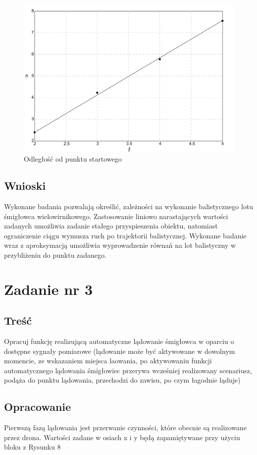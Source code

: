 \documentclass[polish,11pt,a4paper]{article}
\begin{document}
\begin{figure}[h]
    \centering
    \includegraphics[width=0.65\linewidth]{paraboliczna/st.png}
    \caption{Odległość od punktu startowego}
    \label{fig:enter-label}
\end{figure}

\break
\subsection*{Wnioski}
Wykonane badania pozwalają określić, zależności na wykonanie balistycznego lotu śmigłowca wielowirnikowego.
Zastosowanie liniowo narastających wartości zadanych umożliwia zadanie stałego przyspieszenia obiektu, natomiast
ograniczenie ciągu wymusza ruch po trajektorii balistycznej. Wykonane badanie wraz z aproksymacją umożliwia 
wyprowadzenie równań na lot balistyczny w przybliżeniu do punktu zadanego.

\section*{Zadanie nr 3}
\subsection*{Treść}
Opracuj funkcję realizującą automatyczne lądowanie śmigłowca w oparciu o dostępne 
sygnały pomiarowe (lądowanie może być aktywowane w dowolnym momencie, ze wskazaniem miejsca laowania,
po aktywowaniu funkcji automatycznego lądowania śmigłowiec przerywa wcześniej realizowany scenariusz,
podąża do punktu lądowania, przechodzi do zawisu, po czym łagodnie ląduje)

\subsection*{Opracowanie}
Pierwszą fazą lądowania jest przerwanie czynności, które obecnie są realizowane przez drona. Wartości
zadane w osiach x i y będą zapamiętywane przy użyciu bloku z Rysunku 8
\end{document}
